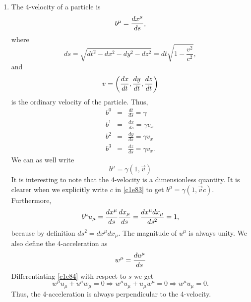 \begin{enumerate}
\item The 4-velocity of a particle is
\begin{equation}\label{c1e78}b^\mu = \frac{d{x^\mu}}{d{s}},
\end{equation}
where
\[
ds = \sqrt{dt^2 - dx^2 - dy^2 - dz^2} = dt\sqrt{1 - \frac{v^2}{c^2}},
\]
and
\[
v = \left(\frac{d{x}}{d{t}}, \frac{d{y}}{d{t}}, \frac{d{z}}{d{t}}\right)
\]
is the ordinary velocity of the particle. Thus,
\begin{eqnarray}
b^0&=&\frac{dt}{ds} = \gamma \label{c1e79}\\
b^1&=&\frac{dx}{ds} = \gamma v_x \label{c1e80} \\
b^2&=&\frac{dy}{ds} = \gamma v_x \label{c1e81} \\
b^3&=&\frac{dz}{ds} = \gamma v_x. \label{c1e82}
\end{eqnarray}
We can as well write
\begin{equation}\label{c1e83}
b^\mu = \gamma(1, \vec{v}) 
\end{equation}
It is interesting to note that the 4-velocity is a dimensionless quantity. It
is clearer when we explicitly write $c$ in \eqref{c1e83} to get $b^\mu = \gamma(
1, \vec{v}{c})$. Furthermore,
\begin{equation}\label{c1e84}
b^\mu u_\mu = \frac{d{x^\mu}}{d{s}}\frac{d{x_\mu}}{d{s}} = \frac{dx^\mu dx_\mu}{ds^2} = 1,
\end{equation}
because by definition $ds^2 = dx^\mu dx_\mu$. The magnitude of $u^\mu$ is always
unity. We also define the 4-acceleration as
\begin{equation}\label{c1e85}
w^\mu = \frac{d{u^\mu}}{d{s}}
\end{equation}
Differentiating \eqref{c1e84} with respect to $s$ we get
\begin{equation}\label{c1e86}
w^\mu u_\mu + u^\mu w_\mu = 0 \Rightarrow w^\mu u_\mu + u_\mu w^\mu = 0 \Rightarrow w^\mu u_\mu = 0.
\end{equation}
Thus, the 4-acceleration is always perpendicular to the 4-velocity.
\end{enumerate}

